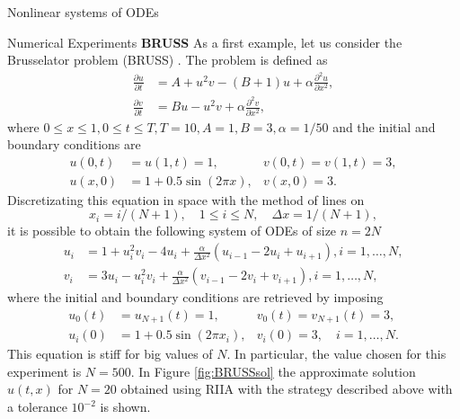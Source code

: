 \documentclass{article}
\begin{document}
\begin{section}{Nonlinear systems of ODEs}
\begin{subsection}{Numerical Experiments}
\textbf{BRUSS} As a first example, let us consider the Brusselator problem (BRUSS) \cite{HW}. The problem is defined as
\begin{equation*}
\begin{aligned}
	\frac{\partial u}{\partial t} &= A + u^2v - (B+1)u + \alpha \frac{\partial^2u}{\partial x^2}, \\
	\frac{\partial v}{\partial t} &= Bu - u^2v + \alpha \frac{\partial^2v}{\partial x^2},
\end{aligned}
\end{equation*}
where $0\leq x \leq 1, 0 \leq t \leq T, T = 10, A = 1, B = 3, \alpha = 1/50$ and the initial and boundary conditions are
\begin{equation*}
\begin{aligned}
	u(0,t) &= u(1,t) = 1,  &  v(0,t) = v(1,t) = 3, \\
	u(x,0) &= 1 + 0.5\sin(2\pi x), &  v(x,0) = 3.
\end{aligned}
\end{equation*}
Discretizating this equation in space with the method of lines on
\begin{equation*}
	x_i = i/(N+1), \quad 1 \leq i \leq N, \quad \Delta x = 1/(N+1),
\end{equation*}
it is possible to obtain the following system of ODEs of size $n = 2N$
\begin{equation}\label{eq:BRUSS}
\begin{aligned}
	u_i &= 1 + u_i^2v_i - 4u_i + \frac{\alpha}{\Delta x^2}(u_{i-1} - 2u_{i} + u_{i+1}), i = 1,\dots,N,\\
	v_i &= 3u_i - u_i^2v_i + \frac{\alpha}{\Delta x^2}(v_{i-1}-2v_i + v_{i+1}), i = 1,\dots,N,
\end{aligned}
\end{equation}
where the initial and boundary conditions are retrieved by imposing
\begin{equation*}
\begin{aligned}
	u_0(t) &= u_{N+1}(t) = 1,  &  v_0(t) = v_{N+1}(t) = 3, \\
	u_i(0) &= 1 + 0.5\sin(2\pi x_i), & v_i(0) = 3, \quad i = 1,\dots,N.
\end{aligned}
\end{equation*}
This equation is stiff for big values of $N$. In particular, the value chosen for this experiment is $N = 500$. In Figure \ref{fig:BRUSSsol} the approximate solution $u(t,x)$ for $N = 20$ obtained using RIIA with the strategy described above with a tolerance $10^{-2}$ is shown.

\end{subsection}
\end{section}
\end{document}
